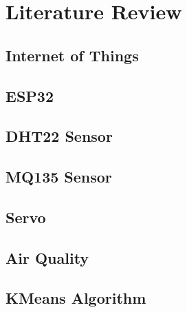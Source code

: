 \section{Literature Review}

\subsection{Internet of Things}
\subsection{ESP32}
\subsection{DHT22 Sensor}
\subsection{MQ135 Sensor}
\subsection{Servo}
\subsection{Air Quality}
\subsection{KMeans Algorithm}
